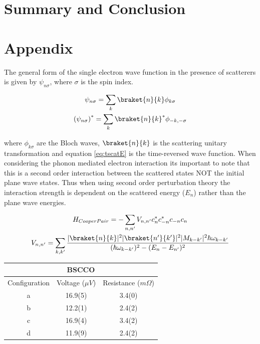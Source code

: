 \documentclass[
reprint,
amsmath,amssymb,
aps,
tikz,
border=5pt
]{revtex4-1}
\begin{document}
 


\section*{Summary \lowercase{and} Conclusion}


\lipsum[2]



\section*{Appendix}
The general form of the single electron wave function in the presence of scatterers is given by $ \psi_{n\sigma}$, where $\sigma$ is the spin index.
    
    \begin{gather}
      \psi_{n\sigma} = \sum_{k}\braket{n}{k} \phi_{k\sigma}
      \label{eq:scatE}\\
      \left(\psi_{n\sigma}\right)^* = \sum_{k}\braket{n}{k}^*\phi_{-k,-\sigma}
      \label{eq:tscatE}
    \end{gather}

    where $\phi_{k\sigma}$ are the Bloch waves, $\braket{n}{k}$ is the scattering unitary transformation and equation \ref{eq:tscatE} is the time-reversed wave function. When considering the phonon mediated electron interaction its important to note that this is a second order interaction between the scattered states NOT the initial plane wave states. Thus when using second order perturbation theory the interaction strength is dependent on the scattered energy ($E_n$) rather than the plane wave energies. 

    \begin{gather}
      H_{Cooper Pair} = -\sum_{n, n'} V_{n, n'} c_n^*c_{-n}^*c_{-n}c_{n} \\
      V_{n, n'} = \sum_{k, k'}\frac{|\braket{n}{k}|^2|\braket{n'}{k'}|^2|M_{k-k'}|^2\hbar\omega_{k-k'}}{(\hbar\omega_{k-k'})^2 - (E_n - E_{n'})^2}
    \end{gather}



    \begin{center}
      \begin{tabular}{ |c|c|c| }
        \hline
        \multicolumn{3}{|c|}{BSCCO} \\
        \hline
        Configuration & Voltage ($\mu V$) & Resistance  ($m\Omega$) \\ 
        \hline
        a & 16.9(5) & 3.4(0)  \\ 
        \hline
        b & 12.2(1) & 2.4(2)  \\ 
        \hline
        c & 16.9(4) & 3.4(2)  \\ 
        \hline
        d & 11.9(9) & 2.4(2)  \\ 
        \hline
      \end{tabular}
    \end{center}
\end{document}
